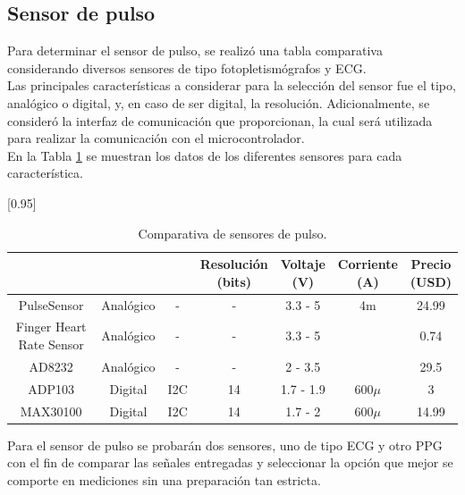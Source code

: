 
\subsection{Sensor de pulso}
Para determinar el sensor de pulso, se realizó una tabla comparativa considerando diversos sensores de tipo fotopletismógrafos y ECG. \\

Las principales características a considerar para la selección del sensor fue el tipo, analógico o digital, y, en caso de ser digital, la resolución. Adicionalmente, se consideró la interfaz de comunicación que proporcionan, la cual será utilizada para realizar la comunicación con el microcontrolador.\\

En la Tabla \ref{analisis:sensorPulso} se muestran los datos de los diferentes sensores para cada característica.

\begin{table}[htbp]
	\begin{center}
		\scalebox{0.95}[0.95]{
		\begin{tabular}{|c|c|c|c|c|c|c|}
			\hline
			\thead{Modelo}&\thead{Tipo}&\thead{Interfaz}&\thead{Resolución \\ (bits)}&\thead{Voltaje \\ (V)}& \thead{Corriente \\ (A)}&\thead{Precio\\ (USD)}\\
			\hline
			\hline
			PulseSensor & Analógico&-&-& 3.3 - 5&4m&24.99 \\
			\hline
			Finger Heart Rate Sensor & Analógico& -&- & 3.3 - 5&&0.74 \\
			\hline
			AD8232 & Analógico& -& - & 2 - 3.5&&29.5 \\
			\hline
			ADP103 & Digital& I2C& 14 & 1.7 - 1.9&$600\mu$&3 \\
			\hline
			MAX30100 & Digital& I2C &14 & 1.7 - 2&$600\mu$&14.99 \\
			\hline
		\end{tabular}}
		\caption{Comparativa de sensores de pulso.}
		\label{analisis:sensorPulso}
	\end{center}
\end{table}
Para el sensor de pulso se probarán dos sensores, uno de tipo ECG y otro PPG con el fin de comparar las señales entregadas y seleccionar la opción que mejor se comporte en mediciones sin una preparación tan estricta. \\

